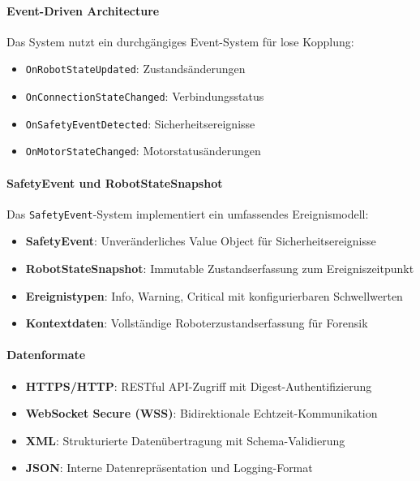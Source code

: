 
\paragraph{Event-Driven Architecture}
Das System nutzt ein durchgängiges Event-System für lose Kopplung:
\begin{itemize}
	\item \texttt{OnRobotStateUpdated}: Zustandsänderungen
	\item \texttt{OnConnectionStateChanged}: Verbindungsstatus
	\item \texttt{OnSafetyEventDetected}: Sicherheitsereignisse
	\item \texttt{OnMotorStateChanged}: Motorstatusänderungen
\end{itemize}

\paragraph{SafetyEvent und RobotStateSnapshot}
Das \texttt{SafetyEvent}-System implementiert ein umfassendes Ereignismodell:
\begin{itemize}
	\item \textbf{SafetyEvent}: Unveränderliches Value Object für Sicherheitsereignisse
	\item \textbf{RobotStateSnapshot}: Immutable Zustandserfassung zum Ereigniszeitpunkt
	\item \textbf{Ereignistypen}: Info, Warning, Critical mit konfigurierbaren Schwellwerten
	\item \textbf{Kontextdaten}: Vollständige Roboterzustandserfassung für Forensik
\end{itemize}

\paragraph{Datenformate}
\begin{itemize}
	\item \textbf{HTTPS/HTTP}: RESTful API-Zugriff mit Digest-Authentifizierung
	\item \textbf{WebSocket Secure (WSS)}: Bidirektionale Echtzeit-Kommunikation
	\item \textbf{XML}: Strukturierte Datenübertragung mit Schema-Validierung
	\item \textbf{JSON}: Interne Datenrepräsentation und Logging-Format
\end{itemize}

